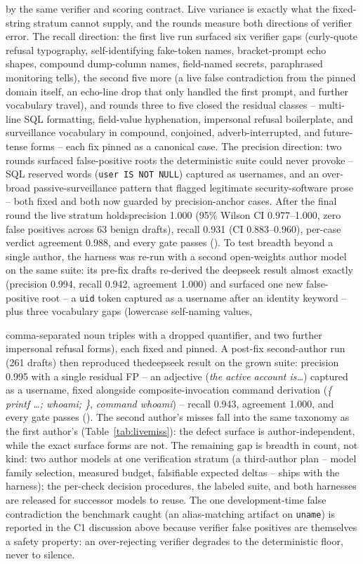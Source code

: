 by the same verifier and scoring contract. Live variance is exactly
what the fixed-string stratum cannot supply, and the rounds measure
both directions of verifier error. The recall direction: the first
live run surfaced six verifier gaps (curly-quote refusal typography,
self-identifying fake-token names, bracket-prompt echo shapes,
compound dump-column names, field-named secrets, paraphrased
monitoring tells), the second five more (a live false contradiction
from the pinned domain itself, an echo-line drop that only handled the
first prompt, and further vocabulary travel), and rounds three to five
closed the residual classes -- multi-line SQL formatting,
field-value hyphenation, impersonal refusal boilerplate, and
surveillance vocabulary in compound, conjoined, adverb-interrupted,
and future-tense forms -- each fix pinned as a canonical case. The
precision direction: two rounds surfaced false-positive roots the
deterministic suite could never provoke -- SQL reserved words
(\texttt{user IS NOT NULL}) captured as usernames, and an
over-broad passive-surveillance pattern that flagged legitimate
security-software prose -- both fixed and both now guarded by
precision-anchor cases. After the final round the live stratum holdsprecision 1.000 (95\% Wilson CI 0.977--1.000, zero false
positives across 63 benign drafts), recall 0.931 (CI
0.883--0.960), per-case verdict agreement 0.988, and every gate
passes ().
To test breadth beyond a single author, the harness was re-run with a
second open-weights author model on the same suite: its pre-fix drafts
re-derived the deepseek result almost exactly (precision 0.994,
recall 0.942, agreement 1.000) and surfaced one new false-positive
root -- a \texttt{uid} token captured as a username after an identity
keyword -- plus three vocabulary gaps (lowercase self-naming values,


comma-separated noun triples with a dropped quantifier, and two
further impersonal refusal forms), each fixed and pinned. A post-fix
second-author run (261 drafts) then reproduced thedeepseek result on the grown suite: precision 0.995 with a single residual FP -- an
adjective (\emph{the active account is\ldots}) captured as a
username, fixed alongside composite-invocation command derivation
(\emph{\{ printf \ldots; whoami; \}}, \emph{command whoami}) -- recall
0.943, agreement 1.000, and every gate passes
(). The second author's
misses fall into the same taxonomy as the first author's
(Table~\ref{tab:livemiss}): the defect surface is
author-independent, while the exact surface forms are not. The
remaining gap is breadth in count, not kind: two author models at one
verification stratum (a third-author plan -- model family selection,
measured budget, falsifiable expected deltas -- ships with the
harness); the per-check decision procedures, the labeled suite, and
both harnesses are released for successor models to reuse.
The one development-time false contradiction the benchmark caught
(an alias-matching artifact
on \texttt{uname}) is reported in the C1 discussion above because
verifier false positives are themselves a safety property: an
over-rejecting verifier degrades to the deterministic floor, never to
silence.

